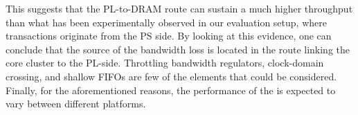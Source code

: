{%
    This suggests that the PL-to-DRAM route can sustain a much higher throughput
    than what has been experimentally observed in our evaluation setup, where
    transactions originate from the PS side.
    By looking at this evidence, one can conclude that the source of the
    bandwidth loss is located in the route linking the core cluster to the PL-side.
    Throttling bandwidth regulators, clock-domain crossing, and shallow FIFOs
    are few of the elements that could be considered. Finally, for the
    aforementioned reasons, the performance of the \schim is expected to vary
    between different platforms.
}
